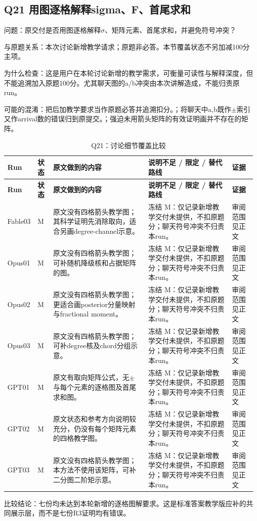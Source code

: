 \documentclass[11pt,a4paper]{article}
\begin{document}
\clearpage
\subsection{Q21 用图逐格解释sigma、F、首尾求和}
\label{aspect:Q21}
问题：原交付是否用图逐格解释\ensuremath{\sigma}、矩阵元素、首尾求和，并避免符号冲突？

与原题关系：本次讨论新增教学请求；原题非必答。本节覆盖状态不另加减100分主项。

为什么检查：这是用户在本轮讨论新增的教学需求，可衡量可读性与解释深度，但不能追溯加入原题100分。尤其聊天图的a/b冲突由本次讲解造成，不能归责原run。

可能的混淆：把后加教学要求当作原题必答并追溯扣分。；将聊天中a,b既作\ensuremath{\pm}索引又作arrival数的错误归到原提交。；强迫未用箭头矩阵的有效证明画并不存在的矩阵。

{\fontsize{9.0}{12.6}\selectfont
\setlength{\tabcolsep}{2.5pt}
\begin{longtable}{>{\raggedright\arraybackslash}p{}>{\raggedright\arraybackslash}p{}>{\raggedright\arraybackslash}p{}>{\raggedright\arraybackslash}p{}>{\raggedright\arraybackslash}p{}}
\caption{Q21：讨论细节覆盖比较}\\
\toprule
\textbf{Run} & \textbf{状态} & \textbf{原文做到的内容} & \textbf{说明不足 / 限定 / 替代路线} & \textbf{证据}\tabularnewline
\midrule
\endfirsthead
\toprule
\textbf{Run} & \textbf{状态} & \textbf{原文做到的内容} & \textbf{说明不足 / 限定 / 替代路线} & \textbf{证据}\tabularnewline
\midrule
\endhead
{}Fable03 & M & 原文没有四格箭头教学图；其科学证明先消除取向，适合另画degree-channel示意。 & 冻结 M：仅记录新增教学交付未提供，不扣原题分；聊天符号冲突不归责本run。 & 审阅范围见正文\tabularnewline
{}Opus01 & M & 原文没有四格箭头教学图；可补随机降级核和占据矩阵的图。 & 冻结 M：仅记录新增教学交付未提供，不扣原题分；聊天符号冲突不归责本run。 & 审阅范围见正文\tabularnewline
{}Opus02 & M & 原文没有四格箭头教学图；更适合画posterior分量映射与fractional moment。 & 冻结 M：仅记录新增教学交付未提供，不扣原题分；聊天符号冲突不归责本run。 & 审阅范围见正文\tabularnewline
{}Opus03 & M & 原文没有四格箭头教学图；可补degree核及chord分组示意。 & 冻结 M：仅记录新增教学交付未提供，不扣原题分；聊天符号冲突不归责本run。 & 审阅范围见正文\tabularnewline
{}GPT01 & M & 原文有取向矩阵公式，无\ensuremath{\pm}与每个元素的逐格图及首尾求和图。 & 冻结 M：仅记录新增教学交付未提供，不扣原题分；聊天符号冲突不归责本run。 & 审阅范围见正文\tabularnewline
{}GPT02 & M & 原文状态和参考方向说明较充分，仍没有每个矩阵元素的四格教学图。 & 冻结 M：仅记录新增教学交付未提供，不扣原题分；聊天符号冲突不归责本run。 & 审阅范围见正文\tabularnewline
{}GPT03 & M & 原文没有四格箭头教学图；本方法不使用该矩阵，可补二分图二阶矩示意。 & 冻结 M：仅记录新增教学交付未提供，不扣原题分；聊天符号冲突不归责本run。 & 审阅范围见正文\tabularnewline
\bottomrule
\end{longtable}
}
比较结论：七份均未达到本轮新增的逐格图解要求。这是标准答案教学版应补的共同展示层，而不是七份R3证明均有错误。
\end{document}
